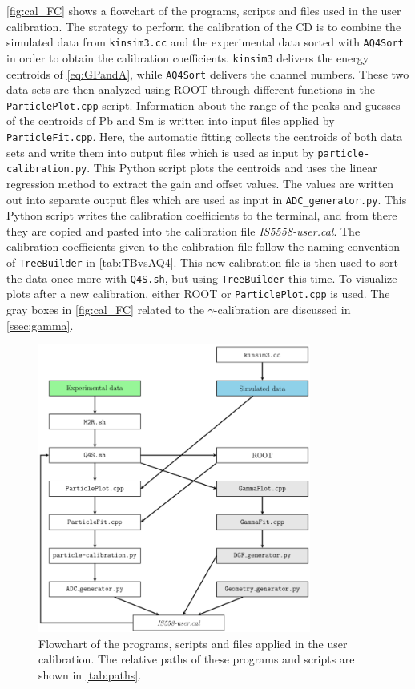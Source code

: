 \documentclass[twoside,english]{uiofysmaster/uiofysmaster}
\newcommand{\ga}{$\gamma$}
\let\orgautoref\autoref
\renewcommand{\autoref}
        {%
		 \def\sectionautorefname{Section}%
		 \def\subsectionautorefname{Section}%
		 \def\subsubsectionautorefname{Section}%
		 \def\chapterautorefname{Chapter}%
          \orgautoref}
\begin{document}
\autoref{fig:cal_FC} shows a flowchart of the programs, scripts and files used in the user calibration. 
The strategy to perform the calibration of the CD is to combine the simulated data from \texttt{kinsim3.cc} and the experimental data sorted with \texttt{AQ4Sort} in order to obtain the calibration coefficients.
\texttt{kinsim3} delivers the energy centroids of \autoref{eq:GPandA}, while \texttt{AQ4Sort} delivers the channel numbers.
These two data sets are then analyzed using ROOT through different functions in the \texttt{ParticlePlot.cpp} script. 
Information about the range of the peaks and guesses of the centroids of Pb and Sm is written into input files applied by \texttt{ParticleFit.cpp}. 
Here, the automatic fitting collects the centroids of both data sets and write them into output files which is used as input by \texttt{particle-calibration.py}. 
This Python script plots the centroids and uses the linear regression method to extract the gain and offset values.
The values are written out into separate output files which are used as input in \texttt{ADC\_generator.py}. 
This Python script writes the calibration coefficients to the terminal, and from there they are copied and pasted into the calibration file \textit{IS5558-user.cal}.
The calibration coefficients given to the calibration file follow the naming convention of \texttt{TreeBuilder} in \autoref{tab:TBvsAQ4}. 
This new calibration file is then used to sort the data once more with \texttt{Q4S.sh}, but using \texttt{TreeBuilder} this time.
To visualize plots after a new calibration, either ROOT or \texttt{ParticlePlot.cpp} is used. 
The gray boxes in \autoref{fig:cal_FC} related to the \ga-calibration are discussed in \autoref{ssec:gamma}.

\begin{figure}[ht]
	\centering
	\includegraphics[width=0.8\textwidth]{Images/Flowchart.png}
	\caption{Flowchart of the programs, scripts and files applied in the user calibration. The relative paths of these programs and scripts are shown in \autoref{tab:paths}.}
	\label{fig:cal_FC}
\end{figure}
\end{document}
